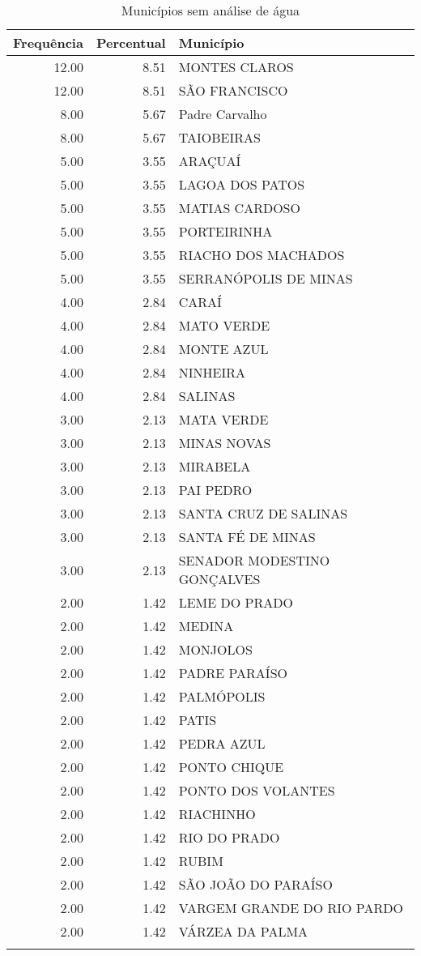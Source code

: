 \documentclass[a4paper, 12pt, openright, oneside, english, brazil, article]{abntex2}
\begin{document}
	\begin{scriptsize}
	\begin{longtable}{rrl}
		\caption{Municípios sem análise de água} \\ 
		\hline
		Frequência & Percentual & Município \\ 
		\hline
		12.00 & 8.51 & MONTES CLAROS \\ 
		12.00 & 8.51 & SÃO FRANCISCO \\ 
		8.00 & 5.67 & Padre Carvalho \\ 
		8.00 & 5.67 & TAIOBEIRAS \\ 
		5.00 & 3.55 & ARAÇUAÍ \\ 
		5.00 & 3.55 & LAGOA DOS PATOS \\ 
		5.00 & 3.55 & MATIAS CARDOSO \\ 
		5.00 & 3.55 & PORTEIRINHA \\ 
		5.00 & 3.55 & RIACHO DOS MACHADOS \\ 
		5.00 & 3.55 & SERRANÓPOLIS DE MINAS \\ 
		4.00 & 2.84 & CARAÍ \\ 
		4.00 & 2.84 & MATO VERDE \\ 
		4.00 & 2.84 & MONTE AZUL \\ 
		4.00 & 2.84 & NINHEIRA \\ 
		4.00 & 2.84 & SALINAS \\ 
		3.00 & 2.13 & MATA VERDE \\ 
		3.00 & 2.13 & MINAS NOVAS \\ 
		3.00 & 2.13 & MIRABELA \\ 
		3.00 & 2.13 & PAI PEDRO \\ 
		3.00 & 2.13 & SANTA CRUZ DE SALINAS \\ 
		3.00 & 2.13 & SANTA FÉ DE MINAS \\ 
		3.00 & 2.13 & SENADOR MODESTINO GONÇALVES \\ 
		2.00 & 1.42 & LEME DO PRADO \\ 
		2.00 & 1.42 & MEDINA \\ 
		2.00 & 1.42 & MONJOLOS \\ 
		2.00 & 1.42 & PADRE PARAÍSO \\ 
		2.00 & 1.42 & PALMÓPOLIS \\ 
		2.00 & 1.42 & PATIS \\ 
		2.00 & 1.42 & PEDRA AZUL \\ 
		2.00 & 1.42 & PONTO CHIQUE \\ 
		2.00 & 1.42 & PONTO DOS VOLANTES \\ 
		2.00 & 1.42 & RIACHINHO \\ 
		2.00 & 1.42 & RIO DO PRADO \\ 
		2.00 & 1.42 & RUBIM \\ 
		2.00 & 1.42 & SÃO JOÃO DO PARAÍSO \\ 
		2.00 & 1.42 & VARGEM GRANDE DO RIO PARDO \\ 
		2.00 & 1.42 & VÁRZEA DA PALMA \\ 
		\hline
		\hline
		\label{motivo1}
	\end{longtable}
	\end{scriptsize}
	
\end{document}
